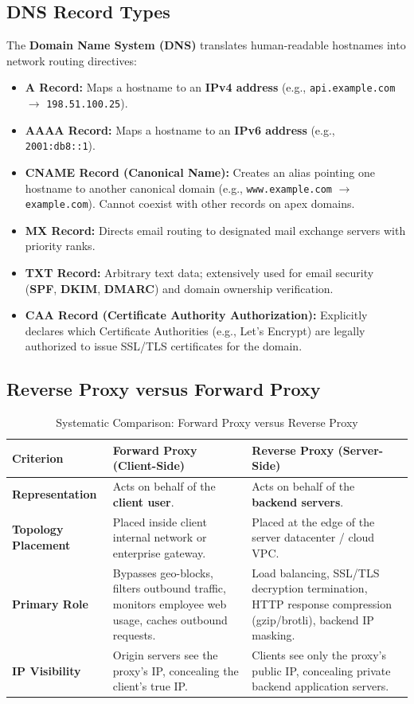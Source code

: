 \subsection{DNS Record Types}
The \textbf{Domain Name System (DNS)} translates human-readable hostnames into network routing directives:
\begin{itemize}
    \item \textbf{A Record:} Maps a hostname to an \textbf{IPv4 address} (e.g., \texttt{api.example.com} $\to$ \texttt{198.51.100.25}).
    \item \textbf{AAAA Record:} Maps a hostname to an \textbf{IPv6 address} (e.g., \texttt{2001:db8::1}).
    \item \textbf{CNAME Record (Canonical Name):} Creates an alias pointing one hostname to another canonical domain (e.g., \texttt{www.example.com} $\to$ \texttt{example.com}). Cannot coexist with other records on apex domains.
    \item \textbf{MX Record:} Directs email routing to designated mail exchange servers with priority ranks.
    \item \textbf{TXT Record:} Arbitrary text data; extensively used for email security (\textbf{SPF}, \textbf{DKIM}, \textbf{DMARC}) and domain ownership verification.
    \item \textbf{CAA Record (Certificate Authority Authorization):} Explicitly declares which Certificate Authorities (e.g., Let's Encrypt) are legally authorized to issue SSL/TLS certificates for the domain.
\end{itemize}

\subsection{Reverse Proxy versus Forward Proxy}
\begin{table}[htbp]
\centering
\small
\caption{Systematic Comparison: Forward Proxy versus Reverse Proxy}
\label{tab:forward_vs_reverse_proxy}
\begin{tabularx}{\textwidth}{l p{5cm} X}
\toprule
\textbf{Criterion} & \textbf{Forward Proxy (Client-Side)} & \textbf{Reverse Proxy (Server-Side)} \\
\midrule
\textbf{Representation} & Acts on behalf of the \textbf{client user}. & Acts on behalf of the \textbf{backend servers}. \\
\textbf{Topology Placement} & Placed inside client internal network or enterprise gateway. & Placed at the edge of the server datacenter / cloud VPC. \\
\textbf{Primary Role} & Bypasses geo-blocks, filters outbound traffic, monitors employee web usage, caches outbound requests. & Load balancing, SSL/TLS decryption termination, HTTP response compression (gzip/brotli), backend IP masking. \\
\textbf{IP Visibility} & Origin servers see the proxy's IP, concealing the client's true IP. & Clients see only the proxy's public IP, concealing private backend application servers. \\
\bottomrule
\end{tabularx}
\end{table}

